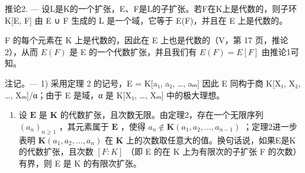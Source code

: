 推论2. --- 设L是K的一个扩张，E、F是L的子扩张。若F在K上是代数的，则子环K{[}E, F{]} 由 E ∪ F 生成的 L 是一个域，它等于 E(F)，并且在 E 上是代数的。

F 的每个元素在 K 上是代数的，因此在 E 上也是代数的（V，第 17 页，推论 2），从而 \(E(F)\) 是 E 的一个代数扩张，并且我们有 \(E(F) = E[F]\) 由推论1可知。

注记。--- 1) 采用定理 2 的记号，E = K{[}a₁, a₂, \ldots, aₘ{]} 因此 E 同构于商 K{[}X₁, X₂, \ldots, Xₘ{]}/α；由于 E 是域，α 是 K{[}X₁, \ldots, Xₘ{]} 中的极大理想。

\begin{enumerate}
\def\labelenumi{\arabic{enumi})}
\setcounter{enumi}{1}
\tightlist
\item
  设 \(\mathbf{E}\) 是 \(\mathbf{K}\) 的代数扩张，且次数无限。由定理2，存在一个无限序列 \((a_n)_{n \geq 1}\) ，其元素属于 \(\mathbf{E}\) ，使得 \(a_n \notin \mathbf{K}(a_1, a_2, \ldots, a_{n-1})\) ；定理2进一步表明 \(\mathbf{K}(a_1, a_2, \ldots, a_n)\) 在 \(\mathbf{K}\) 上的次数取任意大的值。换句话说，如果E是K的代数扩张，且次数 \([F:K]\) （即 E 的在 K 上为有限次的子扩张 F 的次数）有界，则 E 是 K 的有限次扩张。
\end{enumerate}

